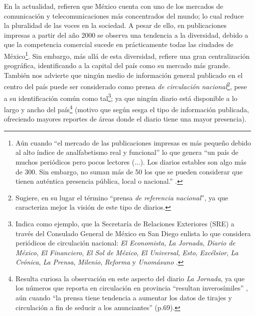 \documentclass[letterpaper, 11pt]{book}
\theoremstyle{definition}
\theoremstyle{remark}
\begin{document}
En la actualidad, \citet{2013_HuertaGomez_ConcentracionMedios} refieren que México cuenta con uno de los mercados de comunicación y telecomunicaciones más concentrados del mundo; lo cual reduce la pluralidad de las voces en la sociedad. 
A pesar de ello, en publicaciones impresas a partir del año 2000 se observa una tendencia a la diversidad, debido a que la competencia comercial sucede en prácticamente todas las ciudades de México\footnote{Aún cuando ``el mercado de las publicaciones impresas es más pequeño debido al alto índice de analfabetismo real y funcional'' \citep[117]{2013_HuertaGomez_ConcentracionMedios} lo que genera ``un país de muchos periódicos pero pocos lectores (...). Los diarios estables son algo más de 300. Sin embargo, no suman más de 50 los que se pueden considerar que tienen auténtica presencia pública, local o nacional.'' \citep[282]{2011_Tesis_LaJornada}.}. 
Sin embargo, más allá de esta diversidad, \citet{2013_Garcia_PrensaMex} refiere una gran centralización geográfica, identificando a la capital del país como su mercado más grande. También nos advierte que ningún medio de información general publicado en el centro del país puede ser considerado como prensa \emph{de circulación nacional}\footnote{
Sugiere, en su lugar el término ``prensa \emph{de referencia nacional}'', ya que caracteriza mejor la visión de este tipo de diarios.}, pese a su identificación común como tal\footnote{
Indica como ejemplo, que la Secretaría de Relaciones Exteriores (SRE) a través del Consulado General de México en San Diego enlista lo que considera periódicos de circulación nacional: \emph{El Economista}, \emph{La Jornada}, \emph{Diario de México}, \emph{El Financiero}, \emph{El Sol de México}, \emph{El Universal}, \emph{Esto}, \emph{Excélsior}, \emph{La Crónica}, \emph{La Prensa}, \emph{Milenio}, \emph{Reforma} y \emph{Unomásuno} \citep[80]{2013_Garcia_PrensaMex}.}; ya que ningún diario está disponible a lo largo y ancho del país\footnote{
Resulta curiosa la observación en este aspecto del diario \emph{La Jornada}, ya que los números que reporta en circulación en provincia ``resultan inverosímiles'' \citep[81]{2013_Garcia_PrensaMex}, aún cuando ``la prensa tiene tendencia a aumentar los datos de tirajes y circulación a fin de seducir a los anunciantes'' (p.69).} (motivo que según \citet{2005_Ortiz_NewspaperData} sesga el tipo de información publicada, ofreciendo mayores reportes de áreas donde el diario tiene una mayor presencia).
\end{document}

